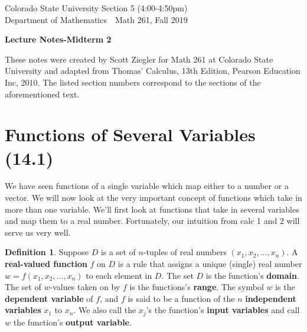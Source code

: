 \documentclass[12pt, letter]{article}
\theoremstyle{plain}
\numberwithin{theorem}{section}
\theoremstyle{definition}
\newtheorem{definition}[theorem]{Definition}
\begin{document}

\noindent
Colorado State University \hfill Section 5 (4:00-4:50pm)\\
Department of Mathematics\ \  \hfill  Math 261, Fall 2019\\
\bigskip
\thispagestyle{empty}

\begin{center}
\begin{large}
\textbf{Lecture Notes-Midterm 2\\
}
\end{large}
\end{center}


\noindent These notes were created by Scott Ziegler for Math 261 at Colorado State University and adapted from Thomas' Calculus, 13th Edition, Pearson Education Inc, 2010. The listed section numbers correspond to the sections of the aforementioned text.



\section{Functions of Several Variables (14.1)}

We have seen functions of a single variable which map either to a number or a vector. We will now look at the very important concept of functions which take in more than one variable. We'll first look at functions that take in several variables and map them to a real number. Fortunately, our intuition from calc 1 and 2 will serve us very well.

\bigskip

\begin{definition}
Suppose $D$ is a set of $n$-tuples of real numbers $(x_1,x_2,...,x_n)$. A \textbf{real-valued function} $f$ on $D$ is a rule that assigns a unique (single) real number $w=f(x_1,x_2,...,x_n)$ to each element in $D$. The set $D$ is the function's \textbf{domain}. The set of $w$-values taken on by $f$ is the functions's \textbf{range}. The symbol $w$ is the \textbf{dependent variable} of $f$, and $f$ is said to be a function of the $n$ \textbf{independent variables} $x_1$ to $x_n$. We also call the $x_j$'s the function's \textbf{input variables} and call $w$ the function's \textbf{output variable}.
\end{definition}
\end{document}
